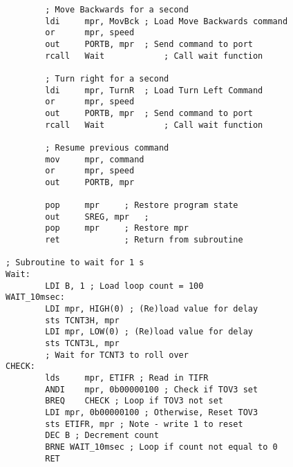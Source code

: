 \documentclass[12pt,letterpaper]{article}
\begin{document}
\begin{verbatim}
        ; Move Backwards for a second
        ldi     mpr, MovBck ; Load Move Backwards command
        or      mpr, speed
        out     PORTB, mpr  ; Send command to port
        rcall   Wait            ; Call wait function

        ; Turn right for a second
        ldi     mpr, TurnR  ; Load Turn Left Command
        or      mpr, speed
        out     PORTB, mpr  ; Send command to port
        rcall   Wait            ; Call wait function

        ; Resume previous command
        mov     mpr, command
        or      mpr, speed
        out     PORTB, mpr

        pop     mpr     ; Restore program state
        out     SREG, mpr   ;
        pop     mpr     ; Restore mpr
        ret             ; Return from subroutine

; Subroutine to wait for 1 s
Wait:
        LDI B, 1 ; Load loop count = 100
WAIT_10msec:
        LDI mpr, HIGH(0) ; (Re)load value for delay
        sts TCNT3H, mpr
        LDI mpr, LOW(0) ; (Re)load value for delay
        sts TCNT3L, mpr
        ; Wait for TCNT3 to roll over
CHECK:
        lds     mpr, ETIFR ; Read in TIFR
        ANDI    mpr, 0b00000100 ; Check if TOV3 set
        BREQ    CHECK ; Loop if TOV3 not set 
        LDI mpr, 0b00000100 ; Otherwise, Reset TOV3
        sts ETIFR, mpr ; Note - write 1 to reset
        DEC B ; Decrement count
        BRNE WAIT_10msec ; Loop if count not equal to 0
        RET 
\end{verbatim}
\end{document}
